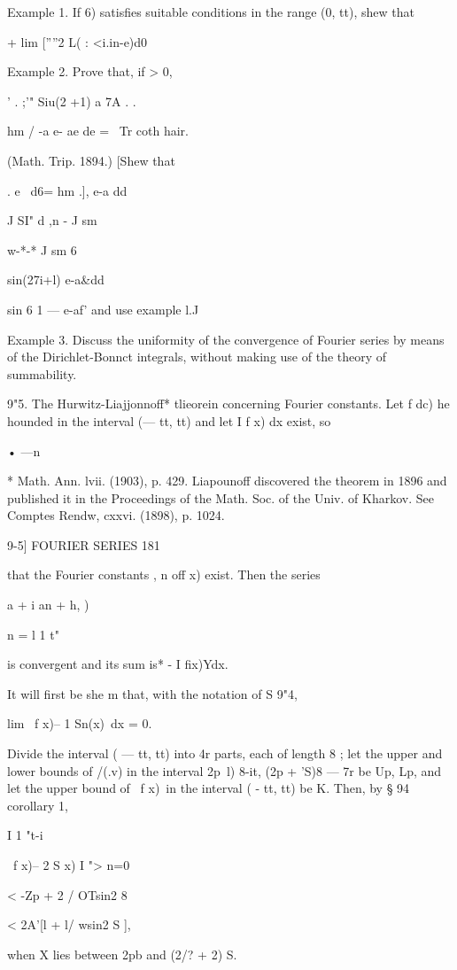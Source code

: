 Example 1. If 6) satisfies suitable conditions in the range (0, tt),
shew that

+ lim [''''2 L( : <i.in-e)d0

Example 2. Prove that, if > 0,

' . ;'" Siu(2 +1) a 7A . .

hm / -a e- ae de = \ Tr coth hair.

(Math. Trip. 1894.) [Shew that

  . e~ d6= hm .], e-a dd

J SI" d ,n - J sm

w-*-* J sm 6

  sin(27i+l) e-a\&dd

sin 6 1 — e-af' and use example l.J

Example 3. Discuss the uniformity of the convergence of Fourier series
by means of the Dirichlet-Bonnct integrals, without making use of the
theory of summability.

9"5. The Hurwitz-Liajjonnoff* tlieorein concerning Fourier constants.
Let f dc) he hounded in the interval (— tt, tt) and let I f x) dx
exist, so

• —n

* Math. Ann. lvii. (1903), p. 429. Liapounoff discovered the theorem
in 1896 and published it in the Proceedings of the Math. Soc. of the
Univ. of Kharkov. See Comptes Rendw, cxxvi. (1898), p. 1024.

9-5] FOURIER SERIES 181

that the Fourier constants , n off x) exist. Then the series

 a + i an + h, )

n = l 1 t"

is convergent and its sum is* - I fix)Ydx.

It will first be she m that, with the notation of S 9"4,

lim \ f x)-- 1 Sn(x)\ dx = 0.

Divide the interval ( — tt, tt) into 4r parts, each of length 8 ; let
the upper and lower bounds of /(.v) in the interval 2p~l) 8-it, (2p +
'S)8 — 7r be Up, Lp, and let the upper bound of \ f x)\ in the
interval ( - tt, tt) be K. Then, by § 94 corollary 1,

I 1 "t-i

\ f x)-- 2 S x) I "> n=0

< -Zp + 2 / OTsin2 8

< 2A'[l + l/ wsin2 S ],

when X lies between 2pb and (2/? + 2) S.

